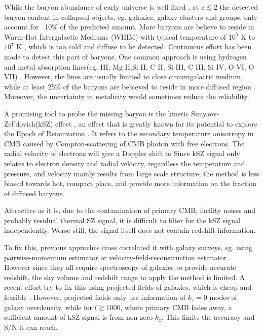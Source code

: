 While the baryon abundance of early universe is well fixed 
\cite{Cooke14,Fukugita98,Komatsu11,Hinshaw13}, 
at $z\lesssim 2$ the detected baryon content in collapsed
objects, eg. galaxies, galaxy clusters and groups, only account for ~10$\%$ of the predicted amount.
More baryons are believe to reside in Warm-Hot Intergalactic Mediums (WHIM) with typical temperature of $10^5$ K to $10^7$ K \cite{Pen1999}\cite{Soltan06}, which is too cold and diffuse to be detected.
Continuous effort has been made to detect this part of baryons. 
One common approach is using hydrogen and metal absorption lines(eg, HI, Mg II,Si II, C II, Si III, C III, Si IV, O VI, O VII) \cite{Fukugita04}\cite{Werk14}.
However, the lines are usually limited to close circumgalactic medium, while at least 25\% of the baryons are bebieved to reside in more diffused region \cite{Dave10}. Moreover, the uncertainty in metalicity would sometimes reduce the reliability.

A promising tool to probe the missing baryon is the kinetic Sunyaev-Zel'dovich(kSZ) effect \cite{Sunyaev72}\cite{Sunyaev80}, 
  an effect that is greatly known for its potential to explore the Epoch of Reionization \cite{Zhang04}\cite{McQuinn05}\cite{Zahn12}. 
It refers to the secondary temperature anisotropy in CMB caused by Compton-scattering of CMB photon with free electrons. 
The radial velocity of electrons will give a Doppler shift to 
Since kSZ signal only relates to electron density and radial velocity, 
regardless the temperature and pressure,  
and velocity mainly results from large scale structure, 
the method is less biased towards hot, compact place, 
and provide more information on the fraction of diffused baryons.

Attractive as it is, 
due to the contamination of primary CMB, facility noises and probably residual thermal SZ signal, 
it is difficult to filter for the kSZ signal independently. 
Worse still, the signal itself does not contain redshift information.

To fix this, previous approches cross correlated it with galaxy surveys, 
eg. using pairwise-momentum estimator \cite{Hand12} or velocity-field-reconstruction estimator \cite{Shao11}\cite{Li14}. 
However since they all require spectroscopy of galaxies to provide accurate redshift, the sky volume and redshift range to apply the method is limited. 
A recent effort try to fix this using projected fields of galaxies, which is cheap and feasible \cite{Hill16}. 
However, projected fields only use information of $k_z=0$ modes of galaxy overdensity, 
while for $l\gtrsim1000$, where primary CMB fades away, a sufficient amount of kSZ signal is from non-zero $k_z$. 
This limits the accuracy and S/N it can reach.

